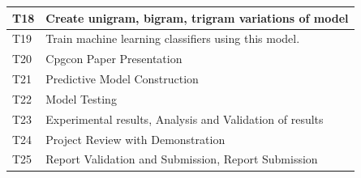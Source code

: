 \documentclass[oneside,a4paper,12pt]{pictreport}
\begin{document}
\begin{table}[]
\begin{tabular}{|l|l|}
T18                  & Create unigram, bigram, trigram variations of model \\ \hline
T19                  & Train machine learning classifiers using this model.
 \\ \hline
T20                  & Cpgcon Paper Presentation
 \\ \hline
T21                  & Predictive Model Construction \\ \hline
T22                  & Model Testing \\ \hline
T23                  & Experimental results, Analysis and Validation of results \\ \hline
T24                  &Project Review with Demonstration
 \\ \hline
T25                  &Report Validation and Submission, Report Submission
 \\ \hline
\end{tabular}
\end{table}
\end{document}
